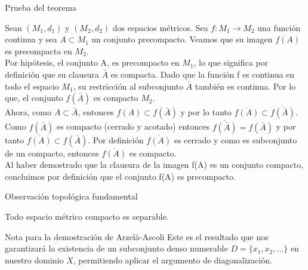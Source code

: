 \begin{frame}{Prueba del teorema}
    \begin{Proof}
        Sean $(M_1,d_1)$ y $(M_2,d_2)$ dos espacios métricos. Sea $f:M_1\to M_2$ una función continua y sea $A\subset M_1$ un conjunto precompacto.
        Veamos que su imagen $f(A)$ es precompacta en $M_2$.\\
        \medskip
        Por hipótesis, el conjunto A, es precompacto en $M_1$, lo que significa por definición que su clausura $\bar{A}$ es compacta. Dado que la función f es 
        continua en todo el espacio $M_1$, su restricción al subconjunto $\bar{A}$ también es continua. Por lo que, el conjunto $f(\bar{A})$ es compacto $M_2$.\\
        \medskip
        Ahora, como $A\subset \bar{A}$, entonces $f(A)\subset f(\bar{A})$ y por lo tanto $\overline{f(A)}\subset \overline{f(\bar{A})}$. Como $f(\bar{A})$ es compacto (cerrado y acotado)
        entonces $\overline{f(\bar{A})} = f(\bar{A})$ y por tanto $\overline{f(A)}\subset f(\bar{A})$. Por definición $\overline{f(A)}$ es cerrado y como es subconjunto de un compacto, entonces
        $\overline{f(A)}$ es compacto.\\
        \medskip
        Al haber demostrado que la clausura de la imagen f(A) es un conjunto compacto, concluimos por definición que el conjunto f(A) es precompacto.
    \end{Proof}
\end{frame}

\begin{frame}{Observación topológica fundamental}
    \begin{corolario}
        Todo espacio métrico compacto es separable.
    \end{corolario}
    \vspace{0.5cm}
    \begin{block}{Nota para la demostración de Arzelà-Ascoli}
        Este es el resultado que nos garantizará la existencia de un subconjunto denso numerable $D = \{x_1, x_2, \dots \}$ en nuestro dominio $X$, permitiendo aplicar el argumento de diagonalización.
    \end{block}
\end{frame}

